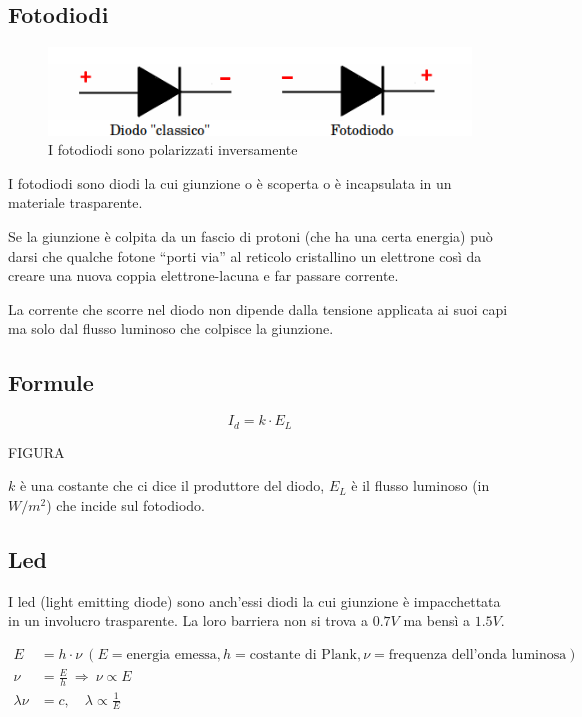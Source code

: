 \documentclass[
]{book}
\begin{document}
\subsection{Fotodiodi}\label{fotodiodi}

\begin{figure}
\centering
\includegraphics[width=0.5\linewidth,height=\textheight,keepaspectratio]{immagini/4.png}
\caption{I fotodiodi sono polarizzati inversamente}
\end{figure}

I fotodiodi sono diodi la cui giunzione o è scoperta o è incapsulata in
un materiale trasparente.

Se la giunzione è colpita da un fascio di protoni (che ha una certa
energia) può darsi che qualche fotone ``porti via'' al reticolo
cristallino un elettrone così da creare una nuova coppia
elettrone-lacuna e far passare corrente.

La corrente che scorre nel diodo non dipende dalla tensione applicata ai
suoi capi ma solo dal flusso luminoso che colpisce la giunzione.

\subsection{Formule}\label{formule-1}

\[
I_d = k \cdot E_{L}
\]

FIGURA

\(k\) è una costante che ci dice il produttore del diodo, \(E_L\) è il
flusso luminoso (in \(W /m^2\)) che incide sul fotodiodo.

\subsection{Led}\label{led}

I led (light emitting diode) sono anch'essi diodi la cui giunzione è
impacchettata in un involucro trasparente. La loro barriera non si trova
a \(0.7V\) ma bensì a \textbf{\(1.5V\)}.

\begin{align*}
E&=h\cdot\nu\ (E = \text{energia emessa}, h = \text{costante di Plank}, \nu = \text{frequenza
dell'onda luminosa})\\
\nu&=\frac{E}{h}\ \Longrightarrow\ \nu\propto E \\
\lambda\nu&=c, \quad \lambda\propto\frac{1}{E}
\end{align*}
\end{document}
